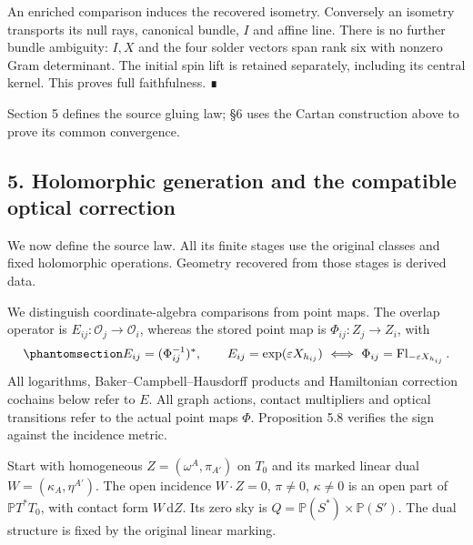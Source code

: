 \documentclass[
  english,
  11pt,
  reqno]{amsart}
\begin{document}
An enriched comparison induces the recovered isometry. Conversely an
isometry transports its null rays, canonical bundle, \(I\) and affine
line. There is no further bundle ambiguity: \(I,X\) and the four solder
vectors span rank six with nonzero Gram determinant. The initial spin
lift is retained separately, including its central kernel. This proves
full faithfulness. ∎

Section 5 defines the source gluing law; §6 uses the Cartan construction
above to prove its common convergence.

\protect{}\label{sec:gg-generation}

\subsection{5. Holomorphic generation and the compatible optical
correction}\label{holomorphic-generation-and-the-compatible-optical-correction}

We now define the source law. All its finite stages use the original
classes and fixed holomorphic operations. Geometry recovered from those
stages is derived data.

We distinguish coordinate-algebra comparisons from point maps. The
overlap operator is \(E_{ij}:\mathcal O_j\to\mathcal O_i\), whereas the
stored point map is \(\Phi_{ij}:Z_j\to Z_i\), with
\begin{equation}\protect\phantomsection\label{eq:gg-overlap-operator-point-convention}{
 E_{ij}=(\Phi_{ij}^{-1})^*,\qquad
 E_{ij}=\exp(\varepsilon X_{h_{ij}})
       \ \Longleftrightarrow\
 \Phi_{ij}=\operatorname{Fl}_{-\varepsilon X_{h_{ij}}}.
}\end{equation} All logarithms, Baker--Campbell--Hausdorff products and
Hamiltonian correction cochains below refer to \(E\). All graph actions,
contact multipliers and optical transitions refer to the actual point
maps \(\Phi\). Proposition 5.8 verifies the sign against the incidence
metric.

Start with homogeneous \(Z=(\omega^A,\pi_{A'})\) on \(T_0\) and its
marked linear dual \(W=(\kappa_A,\eta^{A'})\). The open incidence
\(W\cdot Z=0\), \(\pi\ne0\), \(\kappa\ne0\) is an open part of
\(\mathbb PT^*T_0\), with contact form \(W\,\mathrm dZ\). Its zero sky
is \(Q=\mathbb P(S^*)\times\mathbb P(S')\). The dual structure is fixed
by the original linear marking.
\end{document}
